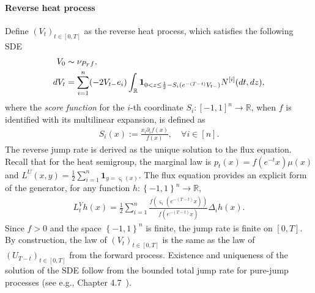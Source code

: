 \documentclass[11pt]{article}
\newcommand{\flip}{\varsigma}
\newcommand{\fU}{U}
\newcommand{\fL}{L^U}
\newcommand{\uV}{V}
\newcommand{\LV}{L^V}
\newcommand{\tagi}{{[i]}}
\theoremstyle{named}
\theoremstyle{plain}
\newcommand{\defn}{:=}
\newcommand{\real}{\ensuremath{\mathbb{R}}}
\newcommand{\braces}[1]{\left\{ #1 \right \}}
\begin{document}
\paragraph{Reverse heat process} Define $(\uV_t)_{t \in [0, T]}$ as the reverse heat process, which satisfies the following SDE
\begin{align}
  \label{eq:def_reverse_process}
  \uV_0 &\sim \nu_{P_T f}, \notag \\
  d \uV_t &=  \sum_{i=1}^n (-2 \uV_{t-} e_i) \int_\real \mathbf{1}_{0 < z \leq \frac12 - S_i(e^{-{(T-t)}} \uV_{t-})} N^\tagi(dt, dz),
\end{align}
where the \textit{score function} for the $i$-th coordinate $S_i: [-1,1]^n \to \real$, when $f$ is identified with its multilinear expansion, is defined as
\begin{align}
  \label{eq:def_score_fun}
  S_i(x) \defn \frac{x_i \partial_i f (x)}{ f(x)}, \quad \forall i \in [n].
\end{align}
The reverse jump rate is derived as the unique solution to the flux equation. 
Recall that for the heat semigroup, the marginal law is $p_t(x) = f(e^{-t} x) \mu(x)$ and $\fL(x, y) = \frac12 \sum_{i=1}^n \mathbf{1}_{y = \flip_i(x)}$. The flux equation provides an explicit form of the generator, for any function $h:\braces{-1,1}^n \to \real$,
\begin{align*}
  \LV_t h(x) = \frac12 \sum_{i=1}^n \frac{f(\flip_i(e^{-(T-t)} x))}{f(e^{-(T-t)} x)}  \Delta_i h(x).
\end{align*}
Since $f > 0$ and the space $\braces{-1,1}^n$ is finite, the jump rate is finite on $[0, T]$. By construction, the law of $(\uV_t)_{t \in [0, T]}$ is the same as the law of $(\fU_{T-t})_{t \in [0, T]}$ from the forward process. Existence and uniqueness of the solution of the SDE follow from the bounded total jump rate for pure-jump processes (see e.g., Chapter 4.7~\cite{ethier2009markov}).
\end{document}
